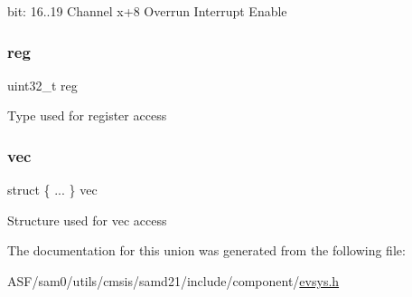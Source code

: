 bit\+: 16..19 Channel x+8 Overrun Interrupt Enable \mbox{\label{union_e_v_s_y_s___i_n_t_e_n_c_l_r___type_a6b91636401516a477989a336376d7b40}} 
\subsubsection{\texorpdfstring{reg}{reg}}
{\footnotesize\ttfamily uint32\+\_\+t reg}

Type used for register access \mbox{\label{union_e_v_s_y_s___i_n_t_e_n_c_l_r___type_a1c37713f2c67a192c0317d48f4183982}} 
\subsubsection{\texorpdfstring{vec}{vec}}
{\footnotesize\ttfamily struct \{ ... \}   vec}

Structure used for vec access 

The documentation for this union was generated from the following file\+:\begin{DoxyCompactItemize}
\item 
A\+S\+F/sam0/utils/cmsis/samd21/include/component/\mbox{\hyperlink{component_2evsys_8h}{evsys.\+h}}\end{DoxyCompactItemize}
